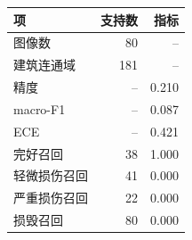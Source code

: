 \begin{tabular}{lrr}
\hline
项 & 支持数 & 指标 \\
\hline
图像数 & 80 & -- \\
建筑连通域 & 181 & -- \\
精度 & -- & 0.210 \\
macro-F1 & -- & 0.087 \\
ECE & -- & 0.421 \\
\hline
完好召回 & 38 & 1.000 \\
轻微损伤召回 & 41 & 0.000 \\
严重损伤召回 & 22 & 0.000 \\
损毁召回 & 80 & 0.000 \\
\hline
\end{tabular}

